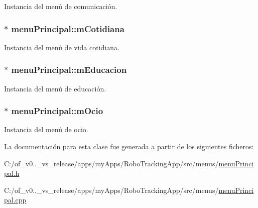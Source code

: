 Instancia del menú de comunicación. 

\hypertarget{classmenu_principal_a67ce856e4bf6566b0e2dc4f6c1471e19}{}
\subsubsection[{m\+Cotidiana}]{$\ast$ menu\+Principal\+::m\+Cotidiana\hspace{0.3cm}{\ttfamily [private]}}\label{classmenu_principal_a67ce856e4bf6566b0e2dc4f6c1471e19}


Instancia del menú de vida cotidiana. 

\hypertarget{classmenu_principal_a495c578e5fba7f2453f963e88c193b5d}{}
\subsubsection[{m\+Educacion}]{$\ast$ menu\+Principal\+::m\+Educacion\hspace{0.3cm}{\ttfamily [private]}}\label{classmenu_principal_a495c578e5fba7f2453f963e88c193b5d}


Instancia del menú de educación. 

\hypertarget{classmenu_principal_a8e372431b14d13de965f84dc0593e08a}{}
\subsubsection[{m\+Ocio}]{$\ast$ menu\+Principal\+::m\+Ocio\hspace{0.3cm}{\ttfamily [private]}}\label{classmenu_principal_a8e372431b14d13de965f84dc0593e08a}


Instancia del menú de ocio. 



La documentación para esta clase fue generada a partir de los siguientes ficheros\+:\begin{DoxyCompactItemize}
\item 
C\+:/of\+\_\+v0..\+\_\+vs\+\_\+release/apps/my\+Apps/\+Robo\+Tracking\+App/src/menus/\hyperlink{menu_principal_8h}{menu\+Principal.\+h}\item 
C\+:/of\+\_\+v0..\+\_\+vs\+\_\+release/apps/my\+Apps/\+Robo\+Tracking\+App/src/menus/\hyperlink{menu_principal_8cpp}{menu\+Principal.\+cpp}\end{DoxyCompactItemize}
